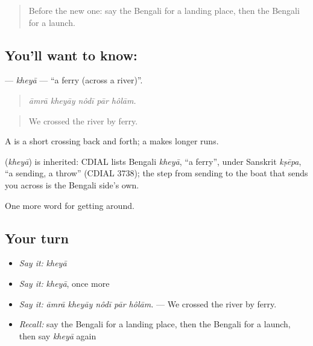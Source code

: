 \begin{quote}
Before the new one: say the Bengali for a landing place, then the Bengali for a launch.
\end{quote}

\subsection*{You'll want to know: }
\textbf{} — \emph{kheyā} — \textquotedblleft{}a ferry (across a river)\textquotedblright{}.

\begin{quote}
    
\end{quote}

\begin{quote}
\emph{āmrā kheyāy nôdī pār hôlām.}
\end{quote}

\begin{quote}
We crossed the river by ferry.
\end{quote}

A  is a short crossing back and forth; a  makes longer runs.

\begin{cousinweb}
\textbf{} (\emph{kheyā}) is inherited: CDIAL lists Bengali \emph{kheyā}, \textquotedblleft{}a ferry\textquotedblright{}, under Sanskrit \emph{kṣēpa}, \textquotedblleft{}a sending, a throw\textquotedblright{} (CDIAL 3738); the step from sending to the boat that sends you across is the Bengali side's own.
\end{cousinweb}

\begin{grammarlens}[title={What you've built}]
One more word for getting around.
\end{grammarlens}

\subsection*{Your turn}
\begin{itemize}
\raggedright
  \item \emph{Say it:} \emph{kheyā}
  \item \emph{Say it:} \emph{kheyā}, once more
  \item \emph{Say it:} \emph{āmrā kheyāy nôdī pār hôlām.} — We crossed the river by ferry.
  \item \emph{Recall:} say the Bengali for a landing place, then the Bengali for a launch, then say \emph{kheyā} again
\end{itemize}

